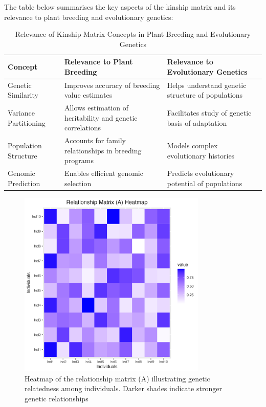 \documentclass[12pt,a4paper]{article}
\begin{document}
The table below summarises the key aspects of the kinship matrix and its relevance to plant breeding and evolutionary genetics:

\begin{table}[h]
\centering
\begin{tabular}{|p{}|p{}|p{}|}
\hline
\textbf{Concept} & \textbf{Relevance to Plant Breeding} & \textbf{Relevance to Evolutionary Genetics} \\
\hline
Genetic Similarity & Improves accuracy of breeding value estimates & Helps understand genetic structure of populations \\
\hline
Variance Partitioning & Allows estimation of heritability and genetic correlations & Facilitates study of genetic basis of adaptation \\
\hline
Population Structure & Accounts for family relationships in breeding programs & Models complex evolutionary histories \\
\hline
Genomic Prediction & Enables efficient genomic selection & Predicts evolutionary potential of populations \\
\hline
\end{tabular}
\caption{Relevance of Kinship Matrix Concepts in Plant Breeding and Evolutionary Genetics}
\label{tab:kinship_relevance}
\end{table}

\begin{figure}[h]
    \centering
    \includegraphics[width=0.8\textwidth]{relationship_matrix.png} %
    \caption{Heatmap of the relationship matrix (A) illustrating genetic relatedness among individuals. Darker shades indicate stronger genetic relationships}
    \label{fig:Relationship Matrix}
\end{figure}
\end{document}

